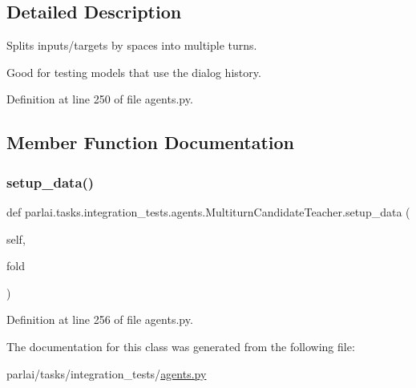 \subsection{Detailed Description}
\begin{DoxyVerb}Splits inputs/targets by spaces into multiple turns.

Good for testing models that use the dialog history.
\end{DoxyVerb}
 

Definition at line 250 of file agents.\+py.



\subsection{Member Function Documentation}
\mbox{\label{classparlai_1_1tasks_1_1integration__tests_1_1agents_1_1MultiturnCandidateTeacher_aed2bfff52c3db13cb2a0d2acf41fdb8f}} 
\subsubsection{\texorpdfstring{setup\+\_\+data()}{setup\_data()}}
{\footnotesize\ttfamily def parlai.\+tasks.\+integration\+\_\+tests.\+agents.\+Multiturn\+Candidate\+Teacher.\+setup\+\_\+data (\begin{DoxyParamCaption}\item[{}]{self,  }\item[{}]{fold }\end{DoxyParamCaption})}



Definition at line 256 of file agents.\+py.



The documentation for this class was generated from the following file\+:\begin{DoxyCompactItemize}
\item 
parlai/tasks/integration\+\_\+tests/\hyperlink{parlai_2tasks_2integration__tests_2agents_8py}{agents.\+py}\end{DoxyCompactItemize}
